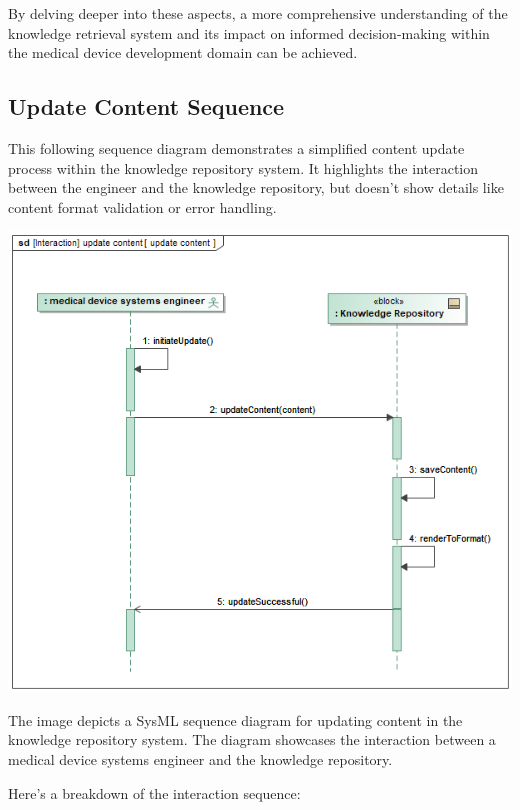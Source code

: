 \documentclass[
  letterpaper,
  DIV=11,
  numbers=noendperiod]{scrreprt}
\begin{document}
By delving deeper into these aspects, a more comprehensive understanding
of the knowledge retrieval system and its impact on informed
decision-making within the medical device development domain can be
achieved.

\subsection{Update Content Sequence}\label{update-content-sequence}

This following sequence diagram demonstrates a simplified content update
process within the knowledge repository system. It highlights the
interaction between the engineer and the knowledge repository, but
doesn't show details like content format validation or error handling.

\includegraphics{images/paste-5.png}

The image depicts a SysML sequence diagram for updating content in the
knowledge repository system. The diagram showcases the interaction
between a medical device systems engineer and the knowledge repository.

Here's a breakdown of the interaction sequence:
\end{document}
